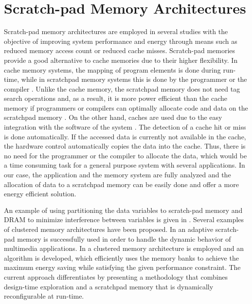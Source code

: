 \section{Scratch-pad Memory Architectures}

Scratch-pad memory architectures are employed in several studies with the objective of improving system performance and energy through means such as reduced memory access count or reduced cache misses. 
Scratch-pad memories provide a good alternative to cache memories due to their higher flexibility.
In cache memory systems, the mapping of program elements is done during run-time, while in scratchpad memory systems this is done by the programmer or the compiler \cite{ishitobi2007code}. 
Unlike the cache memory, the scratchpad memory does not need tag search operations and, as a result, it is more power efficient than the cache memory if programmers or compilers can optimally allocate code and data on the scratchpad memory \cite{steinke2002assigning}.
On the other hand, caches are used due to the easy integration with the software of the system \cite{suhendra2006integrated}.
The detection of a cache hit or miss is done automatically. 
If the accessed data is currently not available in the cache, the hardware control automatically
copies the data into the cache.
Thus, there is no need for the programmer or the compiler to allocate the data, which would be a time consuming task for a general purpose system with several applications.
In our case, the application and the memory system are fully analyzed and the allocation of data to a scratchpad memory can be easily done and offer a more energy efficient solution.

An example of using partitioning the data variables to scratch-pad memory and DRAM to minimize interference between variables is given in \cite{7}. 
Several examples of clustered memory architectures have been proposed.
In \cite{cho2009adaptive} an adaptive scratch-pad memory is successfully used in order to handle the dynamic behavior of multimedia applications.
In \cite{wang2005energy} a clustered memory architecture is employed and an algorithm is developed, which efficiently uses the memory banks to achieve the maximum energy saving while satisfying the given performance constraint.
The current approach differentiates by presenting a methodology that combines design-time exploration and a scratchpad memory that is dynamically reconfigurable at run-time.

